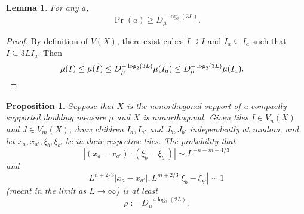 \documentclass[reqno,12pt]{amsart}
\newtheorem{lemma}[theorem]{Lemma}
\newtheorem{proposition}[theorem]{Proposition}
\theoremstyle{definition}
\numberwithin{equation}{section}
\begin{document}
\begin{lemma}
For any $a$,
$$\Pr(a) \geq D_\mu^{-\log_2(3L)}.$$
\end{lemma}
\begin{proof}
By definition of $V(X)$, there exist cubes $\tilde I \supseteq I$ and $\tilde I_a \subseteq I_a$ such that $\tilde I \subseteq 3L \tilde I_a$.
Then 
\begin{align*}
    \mu(I) &\leq \mu(\tilde I) \leq D_\mu^{-\log_2(3L)} \mu(\tilde I_a) \leq D_\mu^{-\log_2(3L)} \mu(I_a). \qedhere 
\end{align*}
\end{proof}

\begin{proposition}\label{good tile select}
Suppose that $X$ is the nonorthogonal support of a compactly supported doubling measure $\mu$ and $X$ is nonorthogonal.
Given tiles $I \in V_n(X)$ and $J \in V_m(X)$, draw children $I_a, I_{a'}$ and $J_b, J_{b'}$ independently at random, and let $x_a, x_{a'}, \xi_b, \xi_{b'}$ be in their respective tiles. 
The probability that 
$$|(x_a - x_{a'}) \cdot (\xi_b - \xi_{b'})| \sim L^{-n-m-4/3}$$
and 
$$L^{n+2/3} |x_a - x_{a'}|, L^{m+2/3} |\xi_b - \xi_{b'}| \sim 1$$
(meant in the limit as $L \to \infty$)
is at least
\begin{equation}\label{probability bound}
    \rho := D_\mu^{-4\log_2(2L)}.
\end{equation}
\end{proposition}
\end{document}
